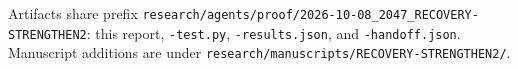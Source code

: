 \documentclass[11pt]{article}
\begin{document}
Artifacts share prefix
\nolinkurl{research/agents/proof/2026-10-08_2047_RECOVERY-STRENGTHEN2}:
this report, \nolinkurl{-test.py}, \nolinkurl{-results.json}, and
\nolinkurl{-handoff.json}. Manuscript additions are under
\nolinkurl{research/manuscripts/RECOVERY-STRENGTHEN2/}.
\end{document}

